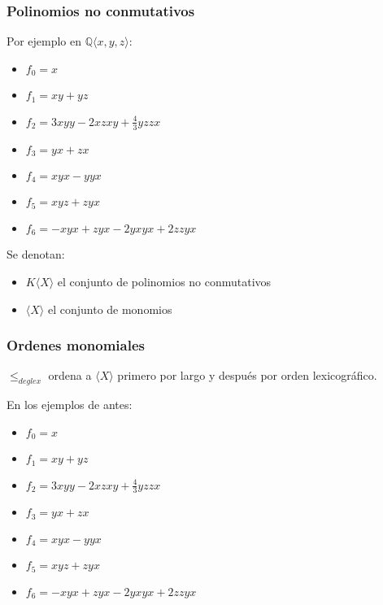 \documentclass[spanish, aspectratio=169, hidecontrols]{beamer}
\begin{document}
\begin{frame}
  \frametitle{Polinomios no conmutativos}
  \pause
  \begin{exampleblock}{Por ejemplo en $ℚ⟨x, y, z⟩$:}
    \begin{itemize}
      \item $f_0 = x$
      \item $f_1 = xy + yz$
      \item $f_2 = 3 xyy - 2 xzxy + \frac{4}{3} yzzx$
      \item $f_3 = yx + zx$
      \item $f_4 = xyx - yyx$
      \item $f_5 = xyz + zyx$
      \item $f_6 = -xyx + zyx - 2 yxyx + 2 zzyx$
    \end{itemize}
  \end{exampleblock}

  \pause

  Se denotan:
  \begin{itemize}
    \item \alert{$K⟨X⟩$} el conjunto de polinomios no conmutativos
    \item $⟨X⟩$ el conjunto de monomios
  \end{itemize}
\end{frame}

\begin{frame}
  \frametitle{Ordenes monomiales}
  $≤_{deglex}$ ordena a $⟨X⟩$ primero por largo y después por orden lexicográfico.
  \pause
  \begin{exampleblock}{En los ejemplos de antes:}
    \begin{itemize}
      \item $f_0 = x$
      \item $f_1 = xy + yz$
      \item $f_2 = 3 xyy - 2 xzxy + \frac{4}{3} yzzx$
      \item $f_3 = yx + zx$
      \item $f_4 = xyx - yyx$
      \item $f_5 = xyz + zyx$
      \item $f_6 = -xyx + zyx - 2 yxyx + 2 zzyx$
    \end{itemize}
  \end{exampleblock}
\end{frame}
\end{document}
